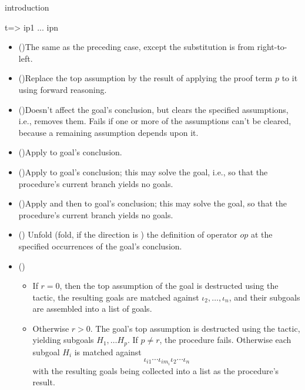 \begin{tactic}[$t$ =>$\;\iota_1 \cdots \iota_n$]{introduction}
\begin{tsyntax}[empty]{t=> ip1 ... ipn}
\begin{itemize}
    \item (\ec{<<-})\quad The same as the preceding case, except
      the substitution is from right-to-left.

    \item ()\quad Replace the top assumption by the result
    of applying the proof term $p$ to it using forward reasoning.

    \item ()\quad Doesn't affect the goal's
      conclusion, but clears the specified assumptions, i.e., removes
      them. Fails if one or more of the assumptions can't be cleared,
      because a remaining assumption depends upon it.

    \item (\ec{/=})\quad Apply  to goal's conclusion.

    \item (\ec{//})\quad Apply  to goal's conclusion;
      this may solve the goal, i.e., so that the procedure's current
      branch yields no goals.

    \item (\ec{/=})\quad Apply  and then 
      to goal's conclusion; this may solve the goal, so that the
      procedure's current branch yields no goals.

    \item ({})\quad
      Unfold (fold, if the direction is \ec{-}) the definition of
      operator $\mathit{op}$ at the specified occurrences of the
      goal's conclusion.

    \item ()\quad
      \begin{itemize}
      \item If $r=0$, then the top assumption of the goal is destructed
        using the  tactic, the resulting goals are
        matched against $\iota_2,\ldots,\iota_n$, and their subgoals
        are assembled into a list of goals.

      \item Otherwise $r>0$. The goal's top assumption is destructed
        using the  tactic, yielding subgoals
        $H_1,\ldots H_p$.  If $p\neq r$, the procedure fails. Otherwise
        each subgoal $H_i$ is matched against
        \begin{displaymath}
          \iota_{i1}\cdots\iota_{i{m_i}}\iota_2\cdots \iota_n
        \end{displaymath}
        with the resulting goals being collected into a list as
        the procedure's result.
      \end{itemize}
    \end{itemize}


\end{tsyntax}
\end{tactic}

